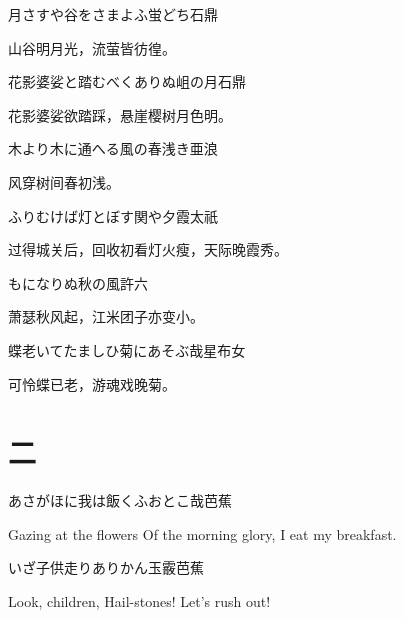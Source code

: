 \begin{haiku}
    {\FH 月さすや谷をさまよふ蛍どち}\hfill{\FH 石鼎}

    {\FK 山谷明月光，流萤皆彷徨。}
\end{haiku}

\begin{haiku}
    {\FH 花影婆娑と踏むべくありぬ岨の月}\hfill{\FH 石鼎}

    {\FK 花影婆娑欲踏踩，悬崖樱树月色明。}
\end{haiku}

\begin{haiku}
    {\FH 木より木に通へる風の春浅き}\hfill{\FH 亜浪}

    {\FK 风穿树间春初浅。}
\end{haiku}

\begin{haiku}
    {\FH ふりむけば灯とぼす関や夕霞}\hfill{\FH 太祇}

    {\FK 过得城关后，回收初看灯火瘦，天际晚霞秀。}
\end{haiku}

\begin{haiku}
    {\FH {}もになりぬ秋の風}\hfill{\FH 許六}

    {\FK 萧瑟秋风起，江米团子亦变小。}
\end{haiku}

\begin{haiku}
    {\FH 蝶老いてたましひ菊にあそぶ哉}\hfill{\FH 星布女}

    {\FK 可怜蝶已老，游魂戏晚菊。}
\end{haiku}

\chapter{\FK 二}
\setcounter{haikucounter}{0}

\begin{haiku}
    {\FH あさがほに我は飯くふおとこ哉}\hfill{\FH 芭蕉}

    \vin{} Gazing at the flowers
    \vin{} \vin{} Of the morning glory,
    \vin{} \vin{} \vin{} I eat my breakfast.
\end{haiku}

\begin{haiku}
    {\FH いざ子供走りありかん玉霰}\hfill{\FH 芭蕉}

    \vin{} Look, children,
    \vin{} \vin{} Hail-stones!
    \vin{} \vin{} \vin{} Let's rush out!
\end{haiku}


